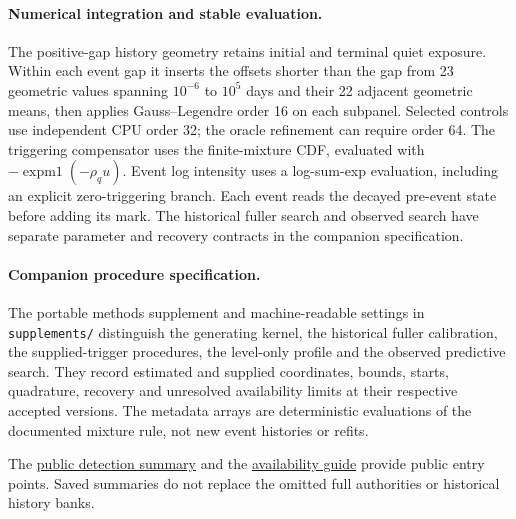 \paragraph{Numerical integration and stable evaluation.}
The positive-gap history geometry retains initial and terminal quiet exposure. Within each event gap it inserts the offsets shorter than the gap from 23 geometric values spanning \(10^{-6}\) to \(10^5\) days and their 22 adjacent geometric means, then applies Gauss--Legendre order 16 on each subpanel. Selected controls use independent CPU order 32; the oracle refinement can require order 64. The triggering compensator uses the finite-mixture CDF, evaluated with \(-\operatorname{expm1}(-\rho_q u)\). Event log intensity uses a log-sum-exp evaluation, including an explicit zero-triggering branch. Each event reads the decayed pre-event state before adding its mark. The historical fuller search and observed search have separate parameter and recovery contracts in the companion specification.

\paragraph{Companion procedure specification.}
The portable methods supplement and machine-readable settings in \texttt{supplements/}
 distinguish the generating kernel, the historical fuller calibration, the supplied-trigger procedures, the level-only profile and the observed predictive search. They record estimated and supplied coordinates, bounds, starts, quadrature, recovery and unresolved availability limits at their respective accepted versions. The metadata arrays are deterministic evaluations of the documented mixture rule, not new event histories or refits.

The \href{https://github.com/Drefetr/InhibitoryEarthquakeModels/blob/3e76a174cf4f58ce601c6c9640c4d0c11168813f/paper/data/detection.json}{public detection summary} and the \hyperref[sec:source-supplements]{availability guide} provide public entry points. Saved summaries do not replace the omitted full authorities or historical history banks.
